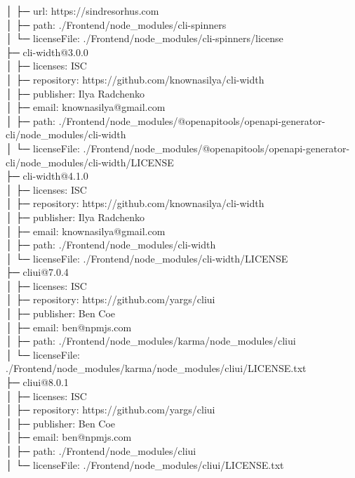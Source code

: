 │  ├─ url: https://sindresorhus.com\\
│  ├─ path: ./Frontend/node\_modules/cli-spinners\\
│  └─ licenseFile: ./Frontend/node\_modules/cli-spinners/license\\
├─ cli-width@3.0.0\\
│  ├─ licenses: ISC\\
│  ├─ repository: https://github.com/knownasilya/cli-width\\
│  ├─ publisher: Ilya Radchenko\\
│  ├─ email: knownasilya@gmail.com\\
│  ├─ path: ./Frontend/node\_modules/@openapitools/openapi-generator-cli/node\_modules/cli-width\\
│  └─ licenseFile: ./Frontend/node\_modules/@openapitools/openapi-generator-cli/node\_modules/cli-width/LICENSE\\
├─ cli-width@4.1.0\\
│  ├─ licenses: ISC\\
│  ├─ repository: https://github.com/knownasilya/cli-width\\
│  ├─ publisher: Ilya Radchenko\\
│  ├─ email: knownasilya@gmail.com\\
│  ├─ path: ./Frontend/node\_modules/cli-width\\
│  └─ licenseFile: ./Frontend/node\_modules/cli-width/LICENSE\\
├─ cliui@7.0.4\\
│  ├─ licenses: ISC\\
│  ├─ repository: https://github.com/yargs/cliui\\
│  ├─ publisher: Ben Coe\\
│  ├─ email: ben@npmjs.com\\
│  ├─ path: ./Frontend/node\_modules/karma/node\_modules/cliui\\
│  └─ licenseFile: ./Frontend/node\_modules/karma/node\_modules/cliui/LICENSE.txt\\
├─ cliui@8.0.1\\
│  ├─ licenses: ISC\\
│  ├─ repository: https://github.com/yargs/cliui\\
│  ├─ publisher: Ben Coe\\
│  ├─ email: ben@npmjs.com\\
│  ├─ path: ./Frontend/node\_modules/cliui\\
│  └─ licenseFile: ./Frontend/node\_modules/cliui/LICENSE.txt\\
